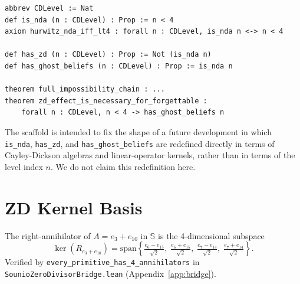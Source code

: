 \documentclass{article}
\begin{document}
\begin{lstlisting}[basicstyle=\tiny\ttfamily]
abbrev CDLevel := Nat
def is_nda (n : CDLevel) : Prop := n < 4
axiom hurwitz_nda_iff_lt4 : forall n : CDLevel, is_nda n <-> n < 4

def has_zd (n : CDLevel) : Prop := Not (is_nda n)
def has_ghost_beliefs (n : CDLevel) : Prop := is_nda n

theorem full_impossibility_chain : ...
theorem zd_effect_is_necessary_for_forgettable :
    forall n : CDLevel, n < 4 -> has_ghost_beliefs n
\end{lstlisting}

The scaffold is intended to fix the shape of a future development in which
\texttt{is\_nda}, \texttt{has\_zd}, and \texttt{has\_ghost\_beliefs} are
redefined directly in terms of Cayley-Dickson algebras and linear-operator
kernels, rather than in terms of the level index $n$. We do not claim this
redefinition here.

\section{ZD Kernel Basis}
\label{app:kernel-basis}

The right-annihilator of $A = e_3 + e_{10}$ in $\mathbb{S}$ is the
4-dimensional subspace
\[
  \ker(R_{e_3+e_{10}}) = \mathrm{span}\!\left\{
    \tfrac{e_6 - e_{15}}{\sqrt{2}},\;
    \tfrac{e_6 + e_{15}}{\sqrt{2}},\;
    \tfrac{e_7 - e_{14}}{\sqrt{2}},\;
    \tfrac{e_7 + e_{14}}{\sqrt{2}}
  \right\}.
\]
Verified by \texttt{every\_primitive\_has\_4\_annihilators} in
\texttt{SounioZeroDivisorBridge.lean} (Appendix~\ref{app:bridge}).
\end{document}
